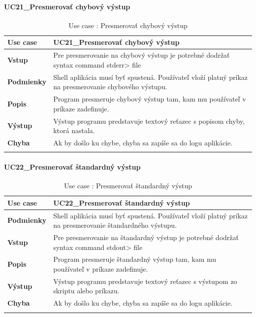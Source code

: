 \paragraph{UC21\_Presmerovať chybový výstup}
\begin{center}
	\begin{longtable}{|p{2.5cm}|p{12.2cm}|}
		
			\hline
			\textbf{Use case} & UC21\_Presmerovať chybový výstup \\ 
			\hline
			\textbf{Vstup} & Pre presmerovanie na chybový výstup je potrebné dodržať syntax command stderr> file\\
			\hline
			\textbf{Podmienky} & Shell aplikácia musí byť spustená. Používateľ vloží platný príkaz na presmerovanie chybového výstupu. \\ 
			\hline
			\textbf{Popis} & Program presmeruje chybový výstup tam, kam mu používateľ v príkaze zadefinuje. \\ 
			\hline
			\textbf{Výstup} & Výstup programu predstavuje textový reťazec s popisom chyby, ktorá nastala.\\
			\hline
			\textbf{Chyba} & Ak by došlo ku chybe, chyba sa zapíše sa do logu aplikácie.\\
			\hline
		\caption{Use case : Presmerovať chybový výstup}
		\label{table:1}
		
	\end{longtable}
\end{center}
\paragraph{UC22\_Presmerovať štandardný výstup}
\begin{center}
	\begin{longtable}{|p{2.5cm}|p{12.2cm}|}
		
			\hline
			\textbf{Use case} & UC22\_Presmerovať štandardný výstup \\ 
			\hline
			\textbf{Podmienky} & Shell aplikácia musí byť spustená. Používateľ vloží platný príkaz na presmerovanie štandardného výstupu. \\ 
			\hline
			\textbf{Vstup} & Pre presmerovanie na štandardný výstup je potrebné dodržať syntax command stdout> file\\
			\hline
			\textbf{Popis} & Program presmeruje štandardný výstup tam, kam mu používateľ v príkaze zadefinuje.\\ 
			\hline
			\textbf{Výstup} & Výstup programu predstavuje textový reťazec s výstupom zo skriptu alebo príkazu.\\
			\hline
			\textbf{Chyba} & Ak by došlo ku chybe, chyba sa zapíše sa do logu aplikácie.\\
			\hline
		\caption{Use case : Presmerovať štandardný výstup }
		\label{table:1}
		
	\end{longtable}
\end{center}




